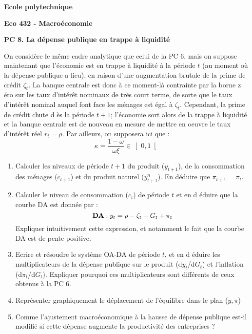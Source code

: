 \documentclass[11pt,a4paper]{article}
\begin{document}
\begin{center}
\textbf{Ecole polytechnique}

\bigskip

\textbf{Eco 432 - Macro\'{e}conomie}

\bigskip

\textbf{PC 8. La d\'{e}pense publique en trappe \`{a} liquidit\'{e}}

\bigskip
\end{center}

On consid\`{e}re le m\^{e}me cadre analytique que celui de la PC 6, mais on
suppose maintenant que l'\'{e}conomie est en trappe \`{a} liquidit\'{e} \`{a}
la p\'{e}riode $t$ (au moment o\`{u} la d\'{e}pense publique a lieu), en
raison d'une augmentation brutale de la prime de cr\'{e}dit $\zeta _{t}$. La
banque centrale est donc \`{a} ce moment-l\`{a} contrainte par la borne z%
\'{e}ro sur les taux d'int\'{e}r\^{e}t nominaux de tr\`{e}s court terme, de
sorte que le taux d'int\'{e}r\^{e}t nominal auquel font face les m\'{e}nages
est \'{e}gal \`{a} $\zeta _{t}$. Cependant, la prime de cr\'{e}dit chute d%
\`{e}s la p\'{e}riode $t+1$; l'\'{e}conomie sort alors de la trappe \`{a}
liquidit\'{e} et la banque centrale est de nouveau en mesure de mettre en
oeuvre le taux d'int\'{e}r\^{e}t r\'{e}el $r_{t}=\rho $. Par ailleurs, on
supposera ici que : 
\begin{equation*}
\kappa =\frac{1-\omega }{\omega \xi }\in \left] 0,1\right[
\end{equation*}

\begin{enumerate}
\item Calculer les niveaux de p\'{e}riode $t+1$ du produit ($y_{t+1}$), de
la consommation des m\'{e}nages ($c_{t+1}$) et du produit naturel ($%
y_{t+1}^{n}$). En d\'{e}duire que $\pi _{t+1}=\pi _{t}$.

\item Calculer le niveau de consommation ($c_{t}$) de p\'{e}riode $t$ et en d%
\'{e}duire que la courbe DA est donn\'{e}e par :%
\begin{equation*}
\text{\textbf{DA}}:y_{t}=\rho -\zeta _{t}+G_{t}+\pi _{t}
\end{equation*}%
Expliquer intuitivement cette expression, et notamment le fait que la courbe
DA est de pente positive.

\item Ecrire et r\'{e}soudre le syst\`{e}me OA-DA de p\'{e}riode $t$, et en d%
\'{e}duire les multiplicateurs de la d\'{e}pense publique sur le produit (d$%
y_{t}$/d$G_{t}$) et l'inflation (d$\pi _{t}$/d$G_{t}$). Expliquer pourquoi
ces multiplicateurs sont diff\'{e}rents de ceux obtenus \`{a} la PC 6.

\item Repr\'{e}senter graphiquement le d\'{e}placement de l'\'{e}quilibre
dans le plan ($y,\pi $)

\item Comme l'ajustement macro\'{e}conomique \`{a} la hausse de d\'{e}pense
publique est-il modifi\'{e} si cette d\'{e}pense augmente la productivit\'{e}
des entreprises ?
\end{enumerate}
\end{document}
